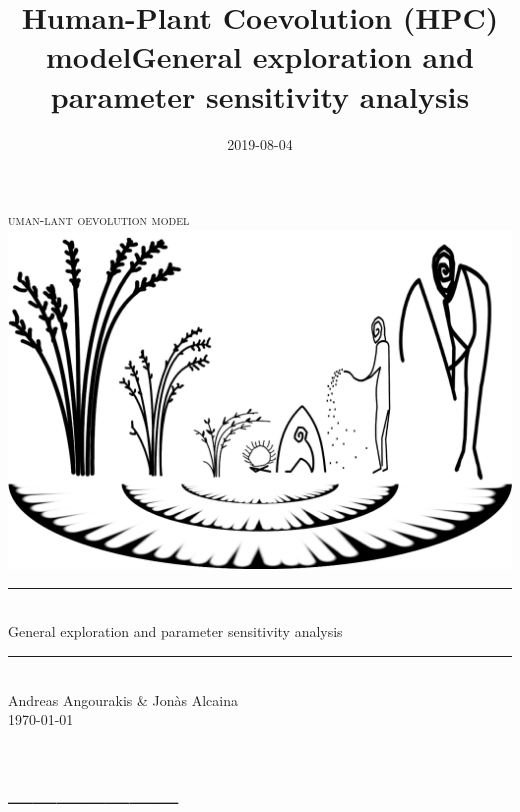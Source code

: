 \documentclass[]{book}
\title{Human-Plant Coevolution (HPC) modelGeneral exploration and parameter sensitivity analysis}
\author{}
\date{2019-08-04}
\begin{document}
\maketitle

\newcommand{\HRule}{\rule{\linewidth}{0.5mm}}


\begin{center}

\textsc{\LARGE
{}uman-lant oevolution model} 
\\[1cm]
\includegraphics[width=\textwidth]{images/hpcModel-logo_v2.png}
\\[1.5cm]
\HRule \\[0.4cm]
{ \huge General exploration and parameter sensitivity analysis \\[0.15cm] }
\HRule \\[1.5cm]
Andreas Angourakis \& Jon\`{a}s Alcaina
\\[1cm]
\today \\ [1cm]

\end{center}

\newpage
{}

{
\hypersetup{linkcolor=black}
\setcounter{tocdepth}{1}
\tableofcontents
}
\hypertarget{section}{%
\chapter*{\_\_\_\_\_\_\_}\label{section}}
\end{document}
